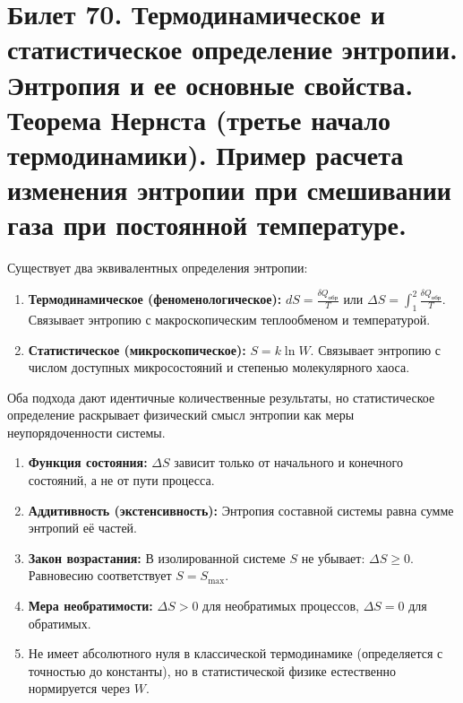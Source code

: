 \section{Билет 70. Термодинамическое и статистическое определение энтропии. Энтропия и ее основные свойства. Теорема Нернста (третье начало термодинамики). Пример расчета изменения энтропии при смешивании газа при постоянной температуре.}

\begin{definition}
Существует два эквивалентных определения энтропии:
\begin{enumerate}
    \item \textbf{Термодинамическое (феноменологическое):} $dS = \frac{\delta Q_{\text{обр}}}{T}$ или $\Delta S = \int_1^2 \frac{\delta Q_{\text{обр}}}{T}$. Связывает энтропию с макроскопическим теплообменом и температурой.
    \item \textbf{Статистическое (микроскопическое):} $S = k \ln W$. Связывает энтропию с числом доступных микросостояний и степенью молекулярного хаоса.
\end{enumerate}
Оба подхода дают идентичные количественные результаты, но статистическое определение раскрывает физический смысл энтропии как меры неупорядоченности системы.
\end{definition}

\begin{property}
\begin{enumerate}
    \item \textbf{Функция состояния:} $\Delta S$ зависит только от начального и конечного состояний, а не от пути процесса.
    \item \textbf{Аддитивность (экстенсивность):} Энтропия составной системы равна сумме энтропий её частей.
    \item \textbf{Закон возрастания:} В изолированной системе $S$ не убывает: $\Delta S \ge 0$. Равновесию соответствует $S = S_{\max}$.
    \item \textbf{Мера необратимости:} $\Delta S > 0$ для необратимых процессов, $\Delta S = 0$ для обратимых.
    \item Не имеет абсолютного нуля в классической термодинамике (определяется с точностью до константы), но в статистической физике естественно нормируется через $W$.
\end{enumerate}
\end{property}

